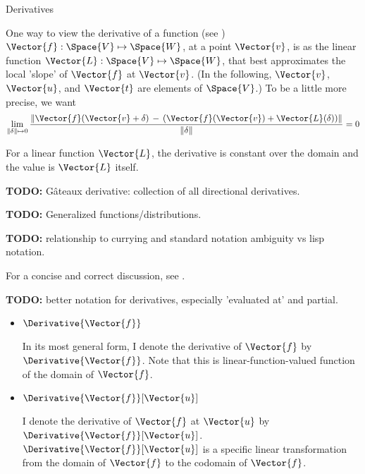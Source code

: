 \begin{plSection}{Derivatives}
\label{sec:Derivatives}

One way to view the derivative of a 
function (see )
$\Vector{f} : \Space{V} \mapsto \Space{W}$,
at a point $\Vector{v}$,
is as the linear function $\Vector{L}:\Space{V} \mapsto \Space{W}$,
that best approximates the local 'slope' of $\Vector{f}$ at $\Vector{v}$.
(In the following, $\Vector{v}$, $\Vector{u}$, and $\Vector{t}$ are elements of $\Space{V}$.)
To be a little more precise, we want
\begin{equation}
\lim_{\|\delta\| \mapsto 0}
\frac{
\|
\Vector{f}(\Vector{v}+\delta)
\,-\,
 (\Vector{f}(\Vector{v}) + \Vector{L}(\delta))
\|}
{\|\delta  \| }
 = 0
\end{equation}

\begin{plNote}{}{}
For a linear function $\Vector{L}$,
the derivative is constant over the domain
and the value is $\Vector{L}$ itself.
\end{plNote}

\textbf{TODO:} G\^{a}teaux derivative: collection of all
directional derivatives.

\textbf{TODO:} Generalized functions/distributions.

\textbf{TODO:}
relationship to currying and standard notation ambiguity vs
lisp notation.

For a concise and correct discussion, 
see .

\textbf{TODO:} better notation for derivatives, especially 
'evaluated at' and partial.

\begin{itemize}

\item $\Derivative{\Vector{f}}$

In its most general form,
I denote the derivative of $\Vector{f}$ by $\Derivative{\Vector{f}}$.
Note that this is linear-function-valued function 
of the domain of $\Vector{f}$.

\item $\Derivative{\Vector{f}}[\Vector{u}]$

I denote the derivative of $\Vector{f}$ at $\Vector{u}$ by 
$\Derivative{\Vector{f}}[\Vector{u}]$.
$\Derivative{\Vector{f}}[\Vector{u}]$ 
is a specific linear transformation from
the domain of $\Vector{f}$ to the codomain of $\Vector{f}$.


\end{itemize}
\end{plSection}
